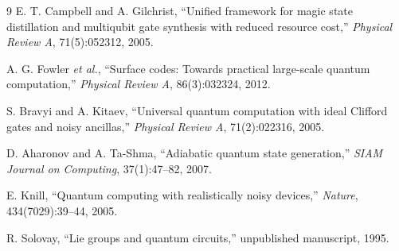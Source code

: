 \documentclass[11pt]{article}
\begin{document}
\begin{thebibliography}{9}
E. T. Campbell and A. Gilchrist, ``Unified framework for magic state distillation and multiqubit
gate synthesis with reduced resource cost,'' \textit{Physical Review A}, 71(5):052312, 2005.

A. G. Fowler \textit{et al.}, ``Surface codes: Towards practical large-scale quantum
computation,'' \textit{Physical Review A}, 86(3):032324, 2012.

S. Bravyi and A. Kitaev, ``Universal quantum computation with ideal Clifford gates and
noisy ancillas,'' \textit{Physical Review A}, 71(2):022316, 2005.

D. Aharonov and A. Ta-Shma, ``Adiabatic quantum state generation,''
\textit{SIAM Journal on Computing}, 37(1):47--82, 2007.

E. Knill, ``Quantum computing with realistically noisy devices,''
\textit{Nature}, 434(7029):39--44, 2005.

R. Solovay, ``Lie groups and quantum circuits,'' unpublished manuscript, 1995.
\end{thebibliography}
\end{document}
